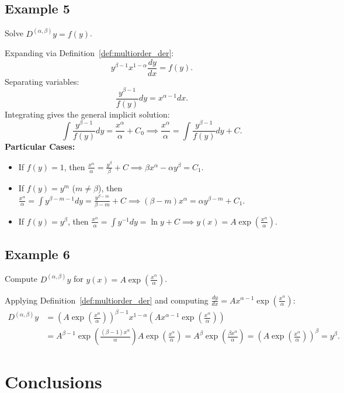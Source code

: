 \documentclass[oneside,10pt]{article}
\theoremstyle{plain}
\theoremstyle{definition}
\begin{document}
\subsection{Example 5}
Solve $D^{(\alpha,\beta)} y = f(y)$.

Expanding via Definition~\ref{def:multiorder_der}:
\[
y^{\beta-1} x^{1-\alpha} \frac{dy}{dx} = f(y).
\]
Separating variables:
\[
\frac{y^{\beta-1}}{f(y)} dy = x^{\alpha-1} dx.
\]
Integrating gives the general implicit solution:
\[
\int \frac{y^{\beta-1}}{f(y)} dy = \frac{x^\alpha}{\alpha} + C_0 \implies \frac{x^\alpha}{\alpha} = \int \frac{y^{\beta-1}}{f(y)} dy + C.
\]
\textbf{Particular Cases:}
\begin{itemize}
    \item If $f(y) = 1$, then $\frac{x^\alpha}{\alpha} = \frac{y^\beta}{\beta} + C \implies \beta x^\alpha - \alpha y^\beta = C_1$.
    \item If $f(y) = y^m$ ($m \neq \beta$), then $\frac{x^\alpha}{\alpha} = \int y^{\beta-m-1} dy = \frac{y^{\beta-m}}{\beta-m} + C \implies (\beta-m) x^\alpha = \alpha y^{\beta-m} + C_1$.
    \item If $f(y) = y^\beta$, then $\frac{x^\alpha}{\alpha} = \int y^{-1} dy = \ln y + C \implies y(x) = A \exp\left( \frac{x^\alpha}{\alpha} \right)$.
\end{itemize}

\subsection{Example 6}
Compute $D^{(\alpha,\beta)} y$ for $y(x) = A \exp\left(\frac{x^\alpha}{\alpha}\right)$.

Applying Definition~\ref{def:multiorder_der} and computing $\frac{dy}{dx} = A x^{\alpha-1} \exp\left(\frac{x^\alpha}{\alpha}\right)$:
\begin{align*}
D^{(\alpha,\beta)} y &= \left( A \exp\left(\frac{x^\alpha}{\alpha}\right) \right)^{\beta-1} x^{1-\alpha} \left( A x^{\alpha-1} \exp\left(\frac{x^\alpha}{\alpha}\right) \right) \\
&= A^{\beta-1} \exp\left( \frac{(\beta-1)x^\alpha}{\alpha} \right) A \exp\left( \frac{x^\alpha}{\alpha} \right) = A^\beta \exp\left( \frac{\beta x^\alpha}{\alpha} \right) = \left( A \exp\left(\frac{x^\alpha}{\alpha}\right) \right)^\beta = y^\beta.
\end{align*}

\section{Conclusions}\label{sec:conclusions}
\end{document}

